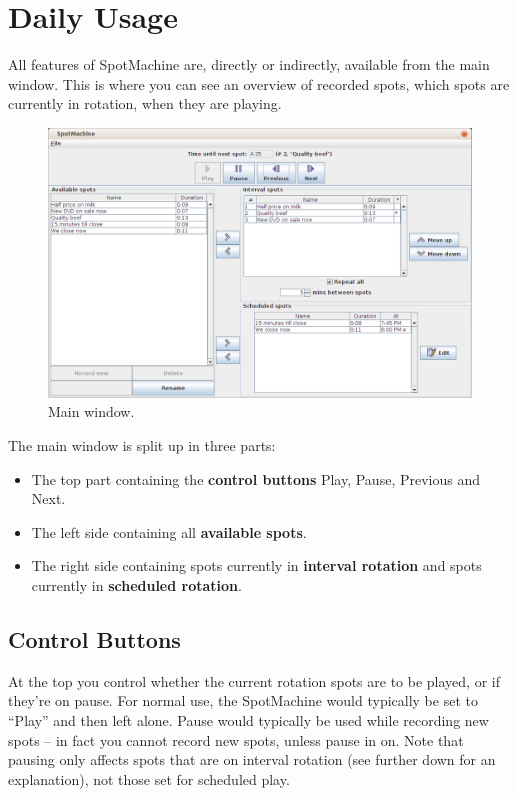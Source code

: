 \documentclass[a4paper,12pt]{report}
\begin{document}
\chapter{Daily Usage}
All features of SpotMachine are, directly or indirectly, available from the main
window. This is where you can see an overview of recorded spots, which spots are
currently in rotation, when they are playing.

\begin{figure}[h]
\centering \includegraphics[width=130mm]{mainwindow.png}
\caption{Main window.}
\end{figure}

The main window is split up in three parts:
\begin{itemize}
\item The top part containing the {\bf control buttons} Play, Pause, Previous
      and Next.
\item The left side containing all {\bf available spots}.
\item The right side containing spots currently in {\bf interval rotation} and
      spots currently in {\bf scheduled rotation}.
\end{itemize}

\section{Control Buttons}
At the top you control whether the current rotation spots are to be played, or
if they're on pause. For normal use, the SpotMachine would typically be set to
``Play'' and then left alone. Pause would typically be used while recording new
spots -- in fact you cannot record new spots, unless pause in on. Note that
pausing only affects spots that are on interval rotation (see further down for
an explanation), not those set for scheduled play. %
\end{document}
